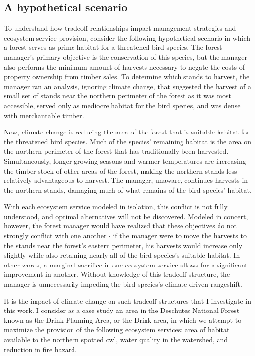 \subsection{A hypothetical scenario}
To understand how tradeoff relationships impact management strategies and ecosystem service provision, consider the following hypothetical scenario in which a forest serves as prime habitat for a threatened bird species. The forest manager's primary objective is the conservation of this species, but the manager also performs the minimum amount of harvests necessary to negate the costs of property ownership from timber sales.  To determine which stands to harvest, the manager ran an analysis, ignoring climate change, that suggested the harvest of a small set of stands near the northern perimeter of the forest as it was most accessible, served only as mediocre habitat for the bird species, and was dense with merchantable timber.

Now, climate change is reducing the area of the forest that is suitable habitat for the threatened bird species. Much of the species' remaining habitat is the area on the northern perimeter of the forest that has traditionally been harvested. Simultaneously, longer growing seasons and warmer temperatures are increasing the timber stock of other areas of the forest, making the northern stands less relatively advantageous to harvest. The manager, unaware, continues harvests in the northern stands, damaging much of what remains of the bird species' habitat.

With each ecosystem service modeled in isolation, this conflict is not fully understood, and optimal alternatives will not be discovered. Modeled in concert, however, the forest manager would have realized that these objectives do not strongly conflict with one another - if the manager were to move the harvests to the stands near the forest's eastern perimeter, his harvests would increase only slightly while also retaining nearly all of the bird species's suitable habitat. In other words, a marginal sacrifice in one ecosystem service allows for a significant improvement in another. Without knowledge of this tradeoff structure, the manager is unnecessarily impeding the bird species's climate-driven rangeshift.

It is the impact of climate change on such tradeoff structures that I investigate in this work. I consider as a case study an area in the Deschutes National Forest known as the Drink Planning Area, or the Drink area, in which we attempt to maximize the provision of the following ecosystem services: area of habitat available to the northern spotted owl, water quality in the watershed, and reduction in fire hazard.